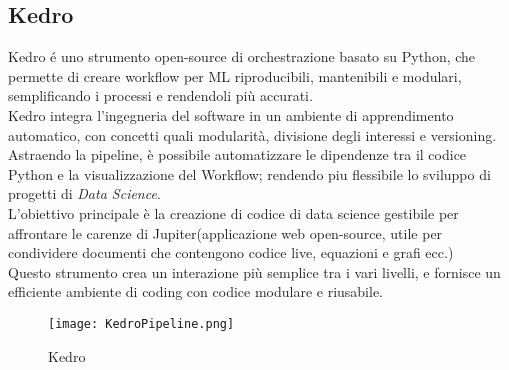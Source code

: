 \documentclass[../tesi.tex]{subfiles}
\begin{document}
\subsection{Kedro}
  Kedro é uno strumento open-source di orchestrazione basato su Python, che permette di creare workflow per ML riproducibili, mantenibili e modulari, semplificando i processi e rendendoli più accurati.\\
  Kedro integra l’ingegneria del software in un ambiente di apprendimento automatico, con concetti quali modularità, divisione degli interessi e versioning.\\
  Astraendo la \Gls{pipeline}, è possibile automatizzare le dipendenze tra il codice Python e la visualizzazione del Workflow; rendendo piu flessibile lo sviluppo di progetti di \textit{Data Science}.\\
  L’obiettivo principale è la creazione di codice di data science gestibile per affrontare le carenze di Jupiter(applicazione web open-source, utile per condividere documenti che contengono codice live, equazioni e grafi ecc.)\\
  Questo strumento crea un interazione più semplice tra i vari livelli, e fornisce un efficiente ambiente di coding con codice modulare e riusabile.\cite{kedroframework}
\begin{figure}[htbp]
  \centering
  \texttt{[image: KedroPipeline.png]} 
  \caption{Kedro}
  \end{figure}  
\end{document}
